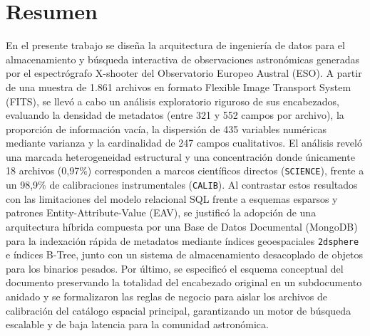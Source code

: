 \documentclass[10pt]{article}
\begin{document}
\thispagestyle{empty}
\tableofcontents
\newpage
{}

\section*{Resumen}

En el presente trabajo se diseña la arquitectura de ingeniería de datos para el almacenamiento y búsqueda interactiva de observaciones astronómicas generadas por el espectrógrafo X-shooter del Observatorio Europeo Austral (ESO). A partir de una muestra de 1.861 archivos en formato Flexible Image Transport System (FITS), se llevó a cabo un análisis exploratorio riguroso de sus encabezados, evaluando la densidad de metadatos (entre 321 y 552 campos por archivo), la proporción de información vacía, la dispersión de 435 variables numéricas mediante varianza y la cardinalidad de 247 campos cualitativos. El análisis reveló una marcada heterogeneidad estructural y una concentración donde únicamente 18 archivos (0,97\%) corresponden a marcos científicos directos (\texttt{SCIENCE}), frente a un 98,9\% de calibraciones instrumentales (\texttt{CALIB}). Al contrastar estos resultados con las limitaciones del modelo relacional SQL frente a esquemas esparsos y patrones Entity-Attribute-Value (EAV), se justificó la adopción de una arquitectura híbrida compuesta por una Base de Datos Documental (MongoDB) para la indexación rápida de metadatos mediante índices geoespaciales \texttt{2dsphere} e índices B-Tree, junto con un sistema de almacenamiento desacoplado de objetos para los binarios pesados. Por último, se especificó el esquema conceptual del documento preservando la totalidad del encabezado original en un subdocumento anidado y se formalizaron las reglas de negocio para aislar los archivos de calibración del catálogo espacial principal, garantizando un motor de búsqueda escalable y de baja latencia para la comunidad astronómica.

\vspace{0.8cm}

\end{document}

